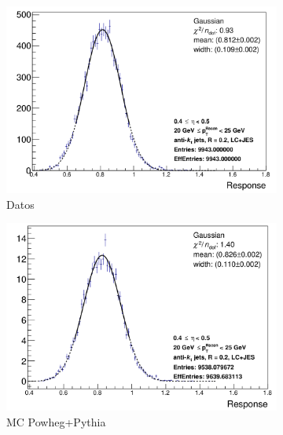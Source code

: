 \begin{figure}[ht]
    \centering
    \begin{subfigure}[b]{0.495\textwidth}
        \centering
        \includegraphics[width=\textwidth]{images/Data_2lc_49}
        \caption{Datos}
    \end{subfigure}
    \hfill
    \begin{subfigure}[b]{0.495\textwidth}
        \centering
        \includegraphics[width=\textwidth]{images/MC_2lc_49}
        \caption{MC Powheg+Pythia}
    \end{subfigure}
    \vfill
    \begin{subfigure}[b]{0.495\textwidth}
        \centering

\end{subfigure}
\end{figure}
